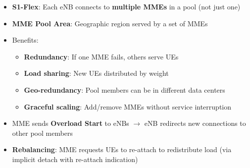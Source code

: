 

\CNchained{}

\begin{itemize}
\tightlist
\item
  \textbf{S1-Flex}: Each eNB connects to \textbf{multiple MMEs} in a pool (not just one)
\item
  \textbf{MME Pool Area}: Geographic region served by a set of MMEs
\item
  Benefits:

  \begin{itemize}
  \tightlist
  \item
    \textbf{Redundancy}: If one MME fails, others serve UEs
  \item
    \textbf{Load sharing}: New UEs distributed by weight
  \item
    \textbf{Geo-redundancy}: Pool members can be in different data centers
  \item
    \textbf{Graceful scaling}: Add/\allowbreak{}remove MMEs without service interruption
  \end{itemize}
\end{itemize}


\begin{itemize}
\tightlist
\item
  MME sends \textbf{Overload Start} to eNBs \ensuremath{\to} eNB redirects new connections to other pool members
\item
  \textbf{Rebalancing}: MME requests UEs to re-attach to redistribute load (via implicit detach with re-attach indication)
\end{itemize}




